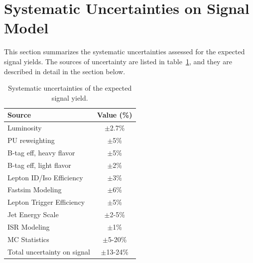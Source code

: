 \clearpage

\section{Systematic Uncertainties on Signal Model}

This section summarizes the systematic uncertainties assessed for the expected signal yields.
The sources of uncertainty are listed in table~\ref{tab:syst}, and they are described in detail in the section below.

\begin{table}[htb]
\begin{center}
\footnotesize
\caption{\label{tab:syst} Systematic uncertainties of the expected signal yield. }
\begin{tabular}{l|c}
\hline
\hline
Source                     & Value (\%) \\
\hline
Luminosity                 & $\pm$2.7\%  \\
PU reweighting             & $\pm$5\%    \\
B-tag eff, heavy flavor    & $\pm$5\%    \\
B-tag eff, light flavor    & $\pm$2\%    \\
Lepton ID/Iso Efficiency   & $\pm$3\%    \\
Fastsim Modeling           & $\pm$6\%    \\
Lepton Trigger Efficiency  & $\pm$5\%    \\
Jet Energy Scale           & $\pm$2-5\%  \\
ISR Modeling               & $\pm$1\%    \\
MC Statistics              & $\pm$5-20\% \\
\hline
Total uncertainty on signal& $\pm$13-24\% \\
\hline
\hline
\end{tabular}
\end{center}
\end{table}

